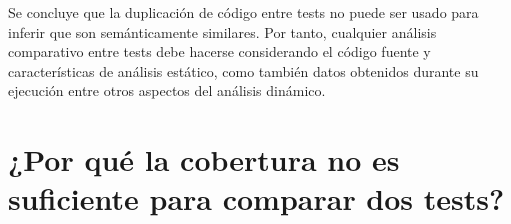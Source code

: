 \par Se concluye que la duplicación de código entre tests no puede ser usado para inferir que son semánticamente similares. Por tanto, cualquier análisis comparativo entre tests debe hacerse considerando el código fuente y características de análisis estático, como también datos obtenidos durante su ejecución entre otros aspectos del análisis dinámico. 












\section{¿Por qué la cobertura no es suficiente para comparar dos tests?}

